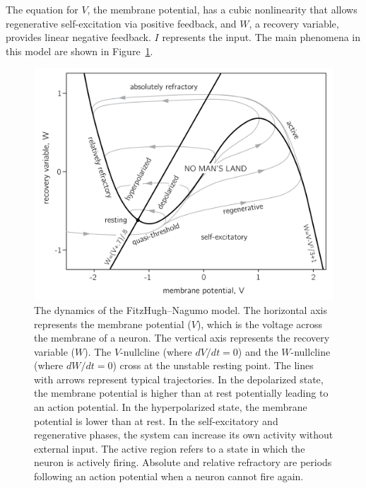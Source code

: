 \documentclass[
  a4paper,
  DIV=11,
  numbers=noendperiod,
  oneside]{scrreprt}
\begin{document}
The equation for \(V\), the membrane potential, has a cubic nonlinearity
that allows regenerative self-excitation via positive feedback, and
\(W\), a recovery variable, provides linear negative feedback. \(I\)
represents the input. The main phenomena in this model are shown in
Figure~\ref{fig-ch4n-img15-old-63}.

\begin{figure}

{\centering \includegraphics{media/ch4n/ch4n-15__figure64.png}

}

\caption{\label{fig-ch4n-img15-old-63}The dynamics of the
FitzHugh--Nagumo model. The horizontal axis represents the membrane
potential (\(V\)), which is the voltage across the membrane of a neuron.
The vertical axis represents the recovery variable (\(W\)). The
\(V\)-nullcline (where \(dV/dt = 0\)) and the \(W\)-nullcline (where
\(dW/dt = 0\)) cross at the unstable resting point. The lines with
arrows represent typical trajectories. In the depolarized state, the
membrane potential is higher than at rest potentially leading to an
action potential. In the hyperpolarized state, the membrane potential is
lower than at rest. In the self-excitatory and regenerative phases, the
system can increase its own activity without external input. The active
region refers to a state in which the neuron is actively firing.
Absolute and relative refractory are periods following an action
potential when a neuron cannot fire again.}

\end{figure}
\end{document}
